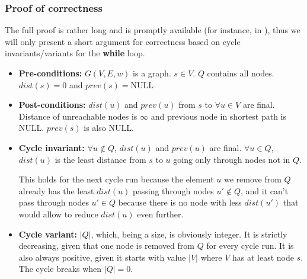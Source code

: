 \subsubsection{Proof of correctness} \label{sec:dijkstra-PoC}
The full proof is rather long and is promptly available (for instance, in \cite[p.~659]{intro-alg}), thus we will only present a short argument for correctness based on cycle invariants/variants for the \textbf{while} loop.
\begin{itemize}
    \item \textbf{Pre-conditions:} $G(V, E, w)$ is a graph. $s \in V$. $Q$ contains all nodes. $dist(s)=0$ and $prev(s)=\text{NULL}$
    \item \textbf{Post-conditions:} $dist(u)$ and $prev(u)$ from $s$ to $\forall u \in V$ are final. Distance of unreachable nodes is $\infty$ and previous node in shortest path is NULL. $prev(s)$ is also NULL.\par
    \item \textbf{Cycle invariant:} $\forall u \not \in Q$, $dist(u)$ and $prev(u)$ are final. $\forall u \in Q$, $dist(u)$ is the least distance from $s$ to $u$ going only through nodes not in $Q$.\par
    This holds for the next cycle run because the element $u$ we remove from $Q$ already has the least $dist(u)$ passing through nodes $u' \not \in Q$, and it can't pass through nodes $u' \in Q$ because there is no node with less $dist(u')$ that would allow to reduce $dist(u)$ even further.
    \item \textbf{Cycle variant:} $|Q|$, which, being a size, is obviously integer. It is strictly decreasing, given that one node is removed from $Q$ for every cycle run. It is also always positive, given it starts with value $|V|$ where $V$ has at least node $s$. The cycle breaks when $|Q| = 0$.
\end{itemize}

